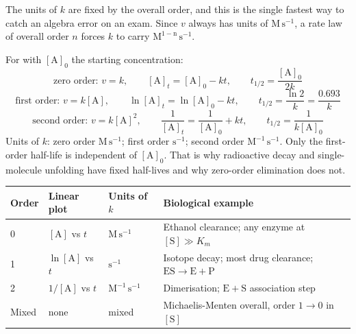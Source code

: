 The units of $k$ are fixed by the overall order, and this is the single fastest way to
catch an algebra error on an exam. Since $v$ always has units of
$\mathrm{M\,s^{-1}}$, a rate law of overall order $n$ forces $k$ to carry
$\mathrm{M^{1-n}\,s^{-1}}$.

\begin{keybox}[title={MEMORIZE: orders, integrated forms, half-lives and units of $k$}]
For  with $[\mathrm{A}]_0$ the starting concentration:
\[
\text{zero order: } v=k,\qquad [\mathrm{A}]_t=[\mathrm{A}]_0-kt,\qquad
t_{1/2}=\frac{[\mathrm{A}]_0}{2k}
\]
\[
\text{first order: } v=k[\mathrm{A}],\qquad \ln[\mathrm{A}]_t=\ln[\mathrm{A}]_0-kt,
\qquad t_{1/2}=\frac{\ln 2}{k}=\frac{0.693}{k}
\]
\[
\text{second order: } v=k[\mathrm{A}]^2,\qquad
\frac{1}{[\mathrm{A}]_t}=\frac{1}{[\mathrm{A}]_0}+kt,\qquad
t_{1/2}=\frac{1}{k[\mathrm{A}]_0}
\]
Units of $k$: zero order $\mathrm{M\,s^{-1}}$; first order $\mathrm{s^{-1}}$; second
order $\mathrm{M^{-1}\,s^{-1}}$.
Only the first-order half-life is independent of $[\mathrm{A}]_0$. That is why
radioactive decay and single-molecule unfolding have fixed half-lives and why
zero-order elimination does not.
\end{keybox}

\begin{tabular}{@{}lllp{3.4cm}@{}}
\toprule
\textbf{Order} & \textbf{Linear plot} & \textbf{Units of $k$} & \textbf{Biological example}\\
\midrule
0 & $[\mathrm{A}]$ vs $t$ & $\mathrm{M\,s^{-1}}$ & Ethanol clearance; any enzyme at $[\mathrm{S}]\gg K_m$\\
1 & $\ln[\mathrm{A}]$ vs $t$ & $\mathrm{s^{-1}}$ & Isotope decay; most drug clearance; $\mathrm{ES\rightarrow E+P}$\\
2 & $1/[\mathrm{A}]$ vs $t$ & $\mathrm{M^{-1}\,s^{-1}}$ & Dimerisation; $\mathrm{E}+\mathrm{S}$ association step\\
Mixed & none & mixed & Michaelis-Menten overall, order $1\rightarrow 0$ in $[\mathrm{S}]$\\
\bottomrule
\end{tabular}


